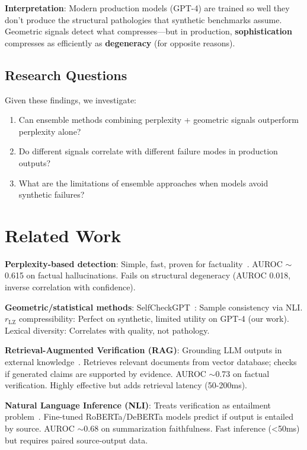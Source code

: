 \documentclass[11pt]{article}
\begin{document}
\textbf{Interpretation}: Modern production models (GPT-4) are trained so well they don't produce the structural pathologies that synthetic benchmarks assume. Geometric signals detect what compresses---but in production, \textbf{sophistication} compresses as efficiently as \textbf{degeneracy} (for opposite reasons).

\subsection{Research Questions}

Given these findings, we investigate:
\begin{enumerate}
\item Can ensemble methods combining perplexity + geometric signals outperform perplexity alone?
\item Do different signals correlate with different failure modes in production outputs?
\item What are the limitations of ensemble approaches when models avoid synthetic failures?
\end{enumerate}

\section{Related Work}
\label{sec:related}

\textbf{Perplexity-based detection}:
Simple, fast, proven for factuality~\cite{lin2022truthfulqa}. AUROC $\sim$0.615 on factual hallucinations. Fails on structural degeneracy (AUROC 0.018, inverse correlation with confidence).

\textbf{Geometric/statistical methods}:
SelfCheckGPT~\cite{manakul2023selfcheck}: Sample consistency via NLI. $r_{\text{LZ}}$ compressibility: Perfect on synthetic, limited utility on GPT-4 (our work). Lexical diversity: Correlates with quality, not pathology.

\textbf{Retrieval-Augmented Verification (RAG)}:
Grounding LLM outputs in external knowledge~\cite{lewis2020rag}. Retrieves relevant documents from vector database; checks if generated claims are supported by evidence. AUROC $\sim$0.73 on factual verification. Highly effective but adds retrieval latency (50-200ms).

\textbf{Natural Language Inference (NLI)}:
Treats verification as entailment problem~\cite{nie2020nli}. Fine-tuned RoBERTa/DeBERTa models predict if output is entailed by source. AUROC $\sim$0.68 on summarization faithfulness. Fast inference (<50ms) but requires paired source-output data.
\end{document}
